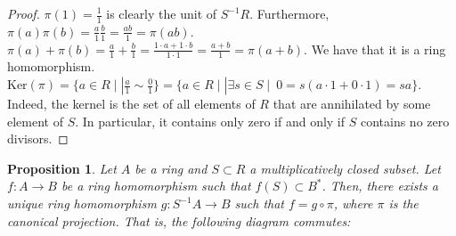 \documentclass[11pt]{article}
\newtheorem{prop}[theorem]{Proposition}
\theoremstyle{definition}
\begin{document}
            \begin{proof}
                $\pi(1) = \frac{1}{1}$ is clearly the unit of $S^{-1}R$.
                Furthermore, $\pi(a) \pi(b) = \frac{a}{1} \frac{b}{1} = \frac{ab}{1} = \pi(ab)$.
                $\pi(a) + \pi(b) = \frac{a}{1} + \frac{b}{1} = \frac{1 \cdot a + 1 \cdot b}{1 \cdot 1} = \frac{a+b}{1} = \pi(a + b)$.
                We have that it is a ring homomorphism. $\text{Ker}(\pi) = \{a \in R \mid | \frac{a}{1} \sim \frac{0}{1}\} =
                \{a \in R \mid | \exists s \in S \mid \ 0 = s (a \cdot 1 + 0 \cdot 1) = sa\}$.
                Indeed, the kernel is the set of all elements of $R$ that are annihilated by some element of $S$.
                In particular, it contains only zero if and only if $S$ contains no zero divisors.
            \end{proof}

        \begin{prop}
            Let $A$ be a ring and $S \subset R$ a multiplicatively closed subset.
            Let $f: A \rightarrow B$ be a ring homomorphism such that $f(S) \subset B^*$.
            Then, there exists a unique ring homomorphism
            $g: S^{-1}A \rightarrow B$ such that $f = g \circ \pi$, where $\pi$
            is the canonical projection.
            That is, the following diagram commutes:

            \begin{center}
            \end{center}

        \end{prop}
\end{document}

